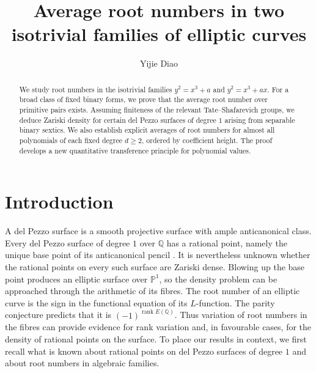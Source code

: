 \documentclass[12pt,reqno]{amsart}
\numberwithin{equation}{section}
\theoremstyle{definition}
\renewcommand{\geq}{\geqslant}
\newcommand{\PP}{\mathbb{P}}
\newcommand{\QQ}{\mathbb{Q}}
\DeclareMathOperator{\rank}{rank}
\begin{document}
\raggedbottom

\title[Average root numbers in isotrivial families]
{Average root numbers in two isotrivial families of elliptic curves}
\author{Yijie Diao}
\address{ISTA\\
Am Campus 1\\
3400 Klosterneuburg\\
Austria}

\begin{abstract}
We study root numbers in the isotrivial families $y^2=x^3+a$ and $y^2=x^3+ax$.
For a broad class of fixed binary forms, we prove that the average root number over primitive pairs exists.
Assuming finiteness of the relevant Tate--Shafarevich groups, we deduce Zariski density for certain del Pezzo surfaces of degree $1$ arising from separable binary sextics.
We also establish explicit averages of root numbers for almost all polynomials of each fixed degree $d\geq2$, ordered by coefficient height.
The proof develops a new quantitative transference principle for polynomial values.
\end{abstract}

\maketitle

\setcounter{tocdepth}{1}
\tableofcontents

\section{Introduction}

A del Pezzo surface is a smooth projective surface with ample anticanonical class.
Every del Pezzo surface of degree $1$ over $\QQ$ has a rational point, namely the unique base point of its anticanonical pencil \cite[Section~2A]{VA}.
It is nevertheless unknown whether the rational points on every such surface are Zariski dense.
Blowing up the base point produces an elliptic surface over $\PP^1$, so the density problem can be approached through the arithmetic of its fibres.
The root number of an elliptic curve is the sign in the functional equation of its $L$-function.
The parity conjecture predicts that it is $(-1)^{\rank E(\QQ)}$.
Thus variation of root numbers in the fibres can provide evidence for rank variation and, in favourable cases, for the density of rational points on the surface.
To place our results in context, we first recall what is known about rational points on del Pezzo surfaces of degree $1$ and about root numbers in algebraic families.
\end{document}
